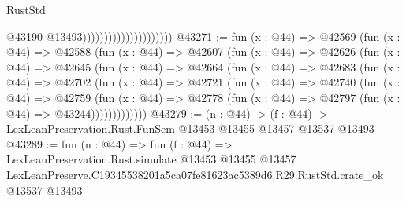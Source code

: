\begin{lexlean}{RustStd}
\begin{coremodule}
                                              @43190
                                              @13493)))))))))))))))))))))
@43271 := fun (x : @44) =>
  @42569
    (fun (x : @44) =>
    @42588
      (fun (x : @44) =>
      @42607
        (fun (x : @44) =>
        @42626
          (fun (x : @44) =>
          @42645
            (fun (x : @44) =>
            @42664
              (fun (x : @44) =>
              @42683
                (fun (x : @44) =>
                @42702
                  (fun (x : @44) =>
                  @42721
                    (fun (x : @44) =>
                    @42740
                      (fun (x : @44) =>
                      @42759
                        (fun (x : @44) =>
                        @42778 (fun (x : @44) => @42797 (fun (x : @44) => @43244)))))))))))))
@43279 := (n : @44) ->
  (f : @44) -> LexLeanPreservation.Rust.FunSem @13453 @13455 @13457 @13537 @13493
@43289 := fun (n : @44) =>
  fun (f : @44) =>
  LexLeanPreservation.Rust.simulate
    @13453
    @13455
    @13457
    LexLeanPreserve.C19345538201a5ca07fe81623ac5389d6.R29.RustStd.crate_ok
    @13537
    @13493
\end{coremodule}
\end{lexlean}

